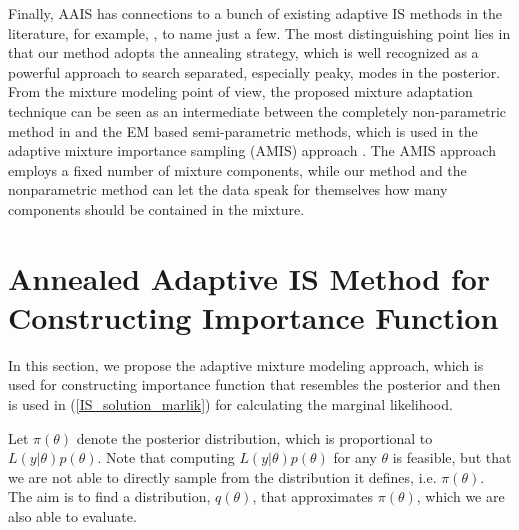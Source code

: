 Finally, AAIS has connections to a bunch of existing adaptive IS
methods in the literature, for example,
\cite{evans1991chaining,oh1993imf,cappe2008ais,cappe2004pmc,west1993mixture,ardia2008adaptive},
to name just a few. The most distinguishing point lies in that our
method adopts the annealing strategy, which is well recognized as a
powerful approach to search separated, especially peaky, modes in the
posterior. From the mixture modeling point of view, the proposed
mixture adaptation technique can be seen as an intermediate between
the completely non-parametric method in \cite{west1993mixture} and the
EM based semi-parametric methods, which is used in the adaptive
mixture importance sampling (AMIS) approach \citep{cappe2008ais}.  The
AMIS approach employs a fixed number of mixture components, while our
method and the nonparametric method \citep{west1993mixture} can let
the data speak for themselves how many components should be contained
in the mixture.

\section{Annealed Adaptive IS Method for Constructing Importance
  Function} \label{sec:AAIS}
In this section, we propose the adaptive mixture modeling approach,
which is used for constructing importance function that resembles
the posterior and then is used in (\ref{IS_solution_marlik}) for
calculating the marginal likelihood.

Let $\pi(\theta)$ denote the posterior distribution, which is
proportional to $L(y|\theta)p(\theta)$. Note that computing
$L(y|\theta)p(\theta)$ for any $\theta$ is feasible, but that we are
not able to directly sample from the distribution it defines, i.e.
$\pi(\theta)$. The aim is to find a distribution, $q(\theta)$, that
approximates $\pi(\theta)$, which we are also able to evaluate.

